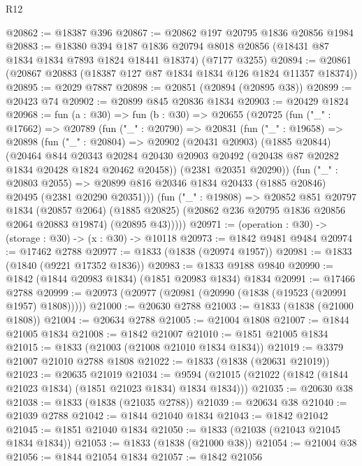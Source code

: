 \begin{lexlean}{R12}
\begin{coremodule}
@20862 := @18387 @396
@20867 := @20862 @197 @20795 @1836 @20856 @1984
@20883 := @18380
    @394
    @187
    @1836
    @20794
    @8018
    @20856
    (@18431 @87 @1834 @1834 @7893 @1824 @18441 @18374)
    (@7177 @3255)
@20894 := @20861 (@20867 @20883 (@18387 @127 @87 @1834 @1834 @126 @1824 @11357 @18374))
@20895 := @2029 @7887
@20898 := @20851 (@20894 (@20895 @38))
@20899 := @20423 @74
@20902 := @20899 @845 @20836 @1834
@20903 := @20429 @1824
@20968 := fun (a : @30) =>
  fun (b : @30) =>
  @20655
    (@20725
      (fun ("_" : @17662) =>
      @20789
        (fun ("_" : @20790) =>
        @20831
          (fun ("_" : @19658) =>
          @20898
            (fun ("_" : @20804) =>
            @20902
              (@20431 @20903)
              (@1885 @20844)
              (@20464
                @844
                @20343
                @20284
                @20430
                @20903
                @20492
                (@20438 @87 @20282 @1834 @20428 @1824 @20462 @20458))
              (@2381 @20351 @20290))
            (fun ("_" : @20803 @2055) =>
            @20899 @816 @20346 @1834 @20433 (@1885 @20846) @20495 (@2381 @20290 @20351)))
          (fun ("_" : @19808) =>
          @20852
            @851
            @20797
            @1834
            (@20857 @2064)
            (@1885 @20825)
            (@20862 @236 @20795 @1836 @20856 @2064 @20883 @19874)
            (@20895 @43)))))
@20971 := (operation : @30) -> (storage : @30) -> (x : @30) -> @10118
@20973 := @1842 @9481 @9484
@20974 := @17462 @2788
@20977 := @1833 (@1838 (@20974 @1957))
@20981 := @1833 (@1840 (@9221 @17352 @1836))
@20983 := @1833 @9188 @9840
@20990 := @1842 (@1844 @20983 @1834) (@1851 @20983 @1834) @1834
@20991 := @17466 @2788
@20999 := @20973 (@20977 (@20981 (@20990 (@1838 (@19523 (@20991 @1957) @1808)))))
@21000 := @20630 @2788
@21003 := @1833 (@1838 (@21000 @1808))
@21004 := @20634 @2788
@21005 := @21004 @1808
@21007 := @1844 @21005 @1834
@21008 := @1842 @21007
@21010 := @1851 @21005 @1834
@21015 := @1833 (@21003 (@21008 @21010 @1834 @1834))
@21019 := @3379 @21007 @21010 @2788 @1808
@21022 := @1833 (@1838 (@20631 @21019))
@21023 := @20635 @21019
@21034 := @9594 (@21015 (@21022 (@1842 (@1844 @21023 @1834) (@1851 @21023 @1834) @1834 @1834)))
@21035 := @20630 @38
@21038 := @1833 (@1838 (@21035 @2788))
@21039 := @20634 @38
@21040 := @21039 @2788
@21042 := @1844 @21040 @1834
@21043 := @1842 @21042
@21045 := @1851 @21040 @1834
@21050 := @1833 (@21038 (@21043 @21045 @1834 @1834))
@21053 := @1833 (@1838 (@21000 @38))
@21054 := @21004 @38
@21056 := @1844 @21054 @1834
@21057 := @1842 @21056

\end{coremodule}
\end{lexlean}
